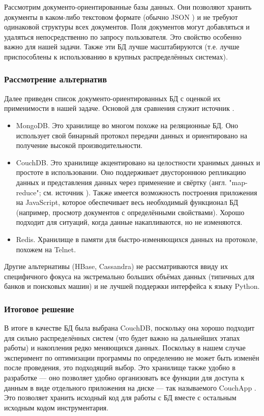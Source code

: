 Рассмотрим документо-ориентированные базы данных. Они позволяют хранить документы в каком-либо текстовом формате (обычно JSON \cite{json}) и не требуют одинаковой структуры всех документов. Поля документов могут добавляться и удаляться непосредственно по запросу пользователя. Это свойство особенно важно для нашей задачи. Также эти БД лучше масштабируются (т.е. лучше приспособлены к использованию в крупных распределённых системах).

\subsubsection{Рассмотрение альтернатив}
Далее приведен список документо-ориентированных БД с оценкой их применимости в нашей задаче. Основой для сравнения служит источник \cite{nosql-comparison}.

\begin{itemize}
    \item MongoDB. Это хранилище во многом похоже на реляционные БД. Оно использует свой бинарный протокол передачи данных и ориентировано на получение высокой производительности.
    \item CouchDB. Это хранилище акцентировано на целостности хранимых данных и простоте в использовании. Оно поддерживает двустороннюю репликацию данных и представления данных через применение и свёртку (англ. "map-reduce"; см. источник \cite{map-reduce}). Также имеется возможность построения приложения на JavaScript, которое обеспечивает весь необходимый функционал БД (например, просмотр документов с определёнными свойствами). Хорошо подходит для ситуаций, когда данные накапливаются, но не изменяются.
    \item Redis. Хранилище в памяти для быстро-изменяющихся данных на протоколе, похожем на Telnet.
\end{itemize}

Другие альтернативы (HBase, Cassandra) не рассматриваются ввиду их специфичного фокуса на экстремально больших объёмах данных (типичных для банков и поисковых машин) и не лучшей поддержки интерфейса к языку {Python}.

\subsubsection{Итоговое решение}
В итоге в качестве БД была выбрана CouchDB, поскольку она хорошо подходит для сильно распределённых систем (что будет важно на дальнейших этапах работы) и накопления редко меняющихся данных. Поскольку в нашем случае эксперимент по оптимизации программы по определению не может быть изменён после проведения, это подходящий выбор.
Это хранилище также удобно в разработке --- оно позволяет удобно организовать все функции для доступа к данным в виде отдельного приложения на диске --- так называемого CouchApp \cite{couchapp}. Это позволяет хранить исходный код для работы с БД вместе с остальным исходным кодом инструментария.


